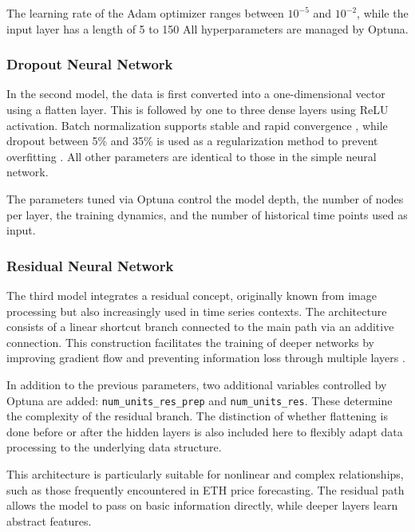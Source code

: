 The learning rate of the Adam optimizer ranges between $10^{-5}$ and $10^{-2}$, while the input layer has a length of 5 to 150
All hyperparameters are managed by Optuna.



\subsubsection{Dropout Neural Network}

In the second model, the data is first converted into a one-dimensional vector using a flatten layer.
This is followed by one to three dense layers using ReLU activation.
Batch normalization supports stable and rapid convergence \cite{batch-normalization}, while dropout between 5\% and 35\% is used as a regularization method to prevent overfitting \cite{keras-dropout}.
All other parameters are identical to those in the simple neural network.

The parameters tuned via Optuna control the model depth, the number of nodes per layer, the training dynamics, and the number of historical time points used as input.



\subsubsection{Residual Neural Network}

The third model integrates a residual concept, originally known from image processing but also increasingly used in time series contexts.
The architecture consists of a linear shortcut branch connected to the main path via an additive connection.
This construction facilitates the training of deeper networks by improving gradient flow and preventing information loss through multiple layers \cite{residual-nn}.

In addition to the previous parameters, two additional variables controlled by Optuna are added: \texttt{num\_units\_res\_prep} and \texttt{num\_units\_res}.
These determine the complexity of the residual branch.
The distinction of whether flattening is done before or after the hidden layers is also included here to flexibly adapt data processing to the underlying data structure.

This architecture is particularly suitable for nonlinear and complex relationships, such as those frequently encountered in ETH price forecasting.
The residual path allows the model to pass on basic information directly, while deeper layers learn abstract features.

